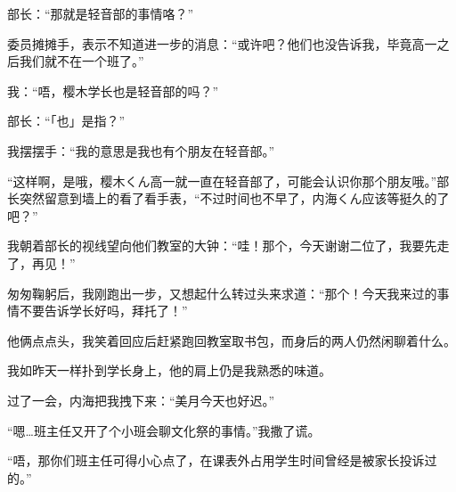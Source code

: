 部长：“那就是轻音部的事情咯？”

委员摊摊手，表示不知道进一步的消息：“或许吧？他们也没告诉我，毕竟高一之后我们就不在一个班了。”

我：“唔，樱木学长也是轻音部的吗？”

部长：“「也」是指？”

我摆摆手：“我的意思是我也有个朋友在轻音部。”

“这样啊，是哦，樱木くん高一就一直在轻音部了，可能会认识你那个朋友哦。”部长突然留意到墙上的看了看手表，“不过时间也不早了，内海くん应该等挺久的了吧？”

我朝着部长的视线望向他们教室的大钟：“哇！那个，今天谢谢二位了，我要先走了，再见！”

匆匆鞠躬后，我刚跑出一步，又想起什么转过头来求道：“那个！今天我来过的事情不要告诉学长好吗，拜托了！”

他俩点点头，我笑着回应后赶紧跑回教室取书包，而身后的两人仍然闲聊着什么。



我如昨天一样扑到学长身上，他的肩上仍是我熟悉的味道。

过了一会，内海把我拽下来：“美月今天也好迟。”

“嗯…班主任又开了个小班会聊文化祭的事情。”我撒了谎。

“唔，那你们班主任可得小心点了，在课表外占用学生时间曾经是被家长投诉过的。”

